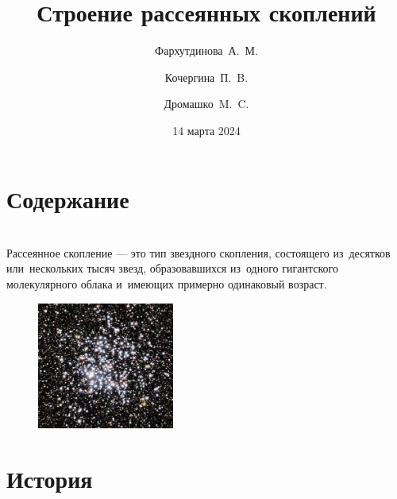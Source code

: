 \documentclass{beamer}
\begin{document}
\title{Строение рассеянных скоплений}
\author[Фархутдинова, Кочергина, Дромашко]{Фархутдинова~А.~М. \and Кочергина~П.~B. \and Дромашко~M.~C.}
\date{14 марта 2024}
\maketitle
\section*{Содержание}
\begin{frame}
    \tableofcontents
\end{frame}
\section*{}
\begin{frame}
    Рассеянное скопление --- это тип звездного скопления, состоящего из~десятков или~нескольких тысяч звезд, 
    образовавшихся из~одного гигантского молекулярного облака и~имеющих примерно одинаковый возраст.
    \begin{figure}
        \centering
        \includegraphics[width=0.4\textwidth]{pictures/РЗС.jpg}
    \end{figure}
\end{frame}


    \section{История}

\end{document}
